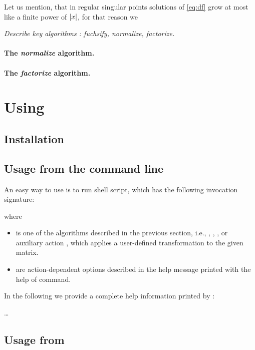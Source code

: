 \documentclass[12pt,a4paper]{article}
\begin{document}
Let us mention, that in regular singular points solutions of \eqref{eq:df} grow at most like a finite power of $\left|x\right|$, for that reason we 

{\it Describe key algorithms \cite{Lee15}: fuchsify, normalize, factorize.}

\paragraph{The {\em normalize} algorithm.}

\paragraph{The {\em factorize} algorithm.}


\section{Using \fuchsia}
\label{sec:3}

\subsection{Installation}

\subsection{Usage from the command line}

An easy way to use \fuchsia is to run  shell script, which has the following invocation signature:


where
\begin{itemize}
  \item {} is one of the algorithms described in the previous section, i.e., , , , or auxiliary action , which applies a user-defined transformation to the given matrix.
  \item {} are action-dependent options described in the help message printed with the help of  command.
\end{itemize}

In the following we provide a complete help information printed by :

\ldots


\subsection{Usage from \sage}
\end{document}
